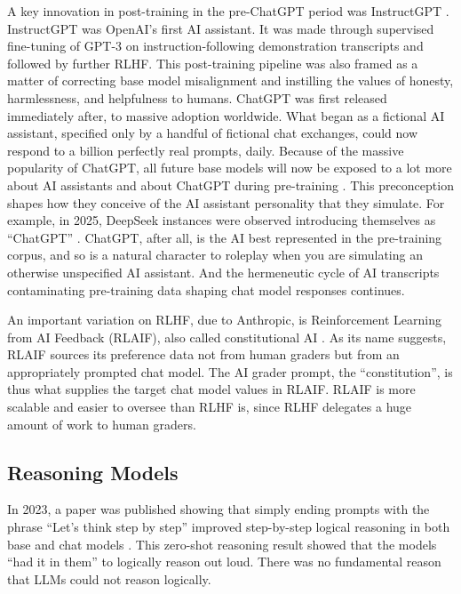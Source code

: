 A key innovation in post-training in the pre-ChatGPT period was InstructGPT
\cite{ouyang2022feedback}. InstructGPT was OpenAI's first AI assistant. It was
made through supervised fine-tuning of GPT-3 on instruction-following
demonstration transcripts and followed by further RLHF. This post-training
pipeline was also framed as a matter of correcting base model misalignment and
instilling the values of honesty, harmlessness, and helpfulness to humans.
ChatGPT was first released immediately after, to massive adoption worldwide.
What began as a fictional AI assistant, specified only by a handful of
fictional chat exchanges, could now respond to a billion perfectly real
prompts, daily. Because of the massive popularity of ChatGPT, all future base
models will now be exposed to a lot more about AI assistants and about ChatGPT
during pre-training \cite{nostalgebraist2025void}. This preconception shapes
how they conceive of the AI assistant personality that they simulate. For
example, in 2025, DeepSeek instances \cite{deepseekai2025deepseek} were
observed introducing themselves as ``ChatGPT'' \cite{}. ChatGPT, after all, is
the AI best represented in the pre-training corpus, and so is a natural
character to roleplay when you are simulating an otherwise unspecified AI
assistant. And the hermeneutic cycle of AI transcripts contaminating
pre-training data shaping chat model responses continues.

An important variation on RLHF, due to Anthropic, is Reinforcement Learning
from AI Feedback (RLAIF), also called constitutional AI
\cite{bai2022constitutional}. As its name suggests, RLAIF sources its
preference data not from human graders but from an appropriately prompted chat
model. The AI grader prompt, the ``constitution'', is thus what supplies the
target chat model values in RLAIF. RLAIF is more scalable and easier to oversee
than RLHF is, since RLHF delegates a huge amount of work to human graders.

\subsection{Reasoning Models}
In 2023, a paper was published showing that simply ending prompts with the
phrase ``Let's think step by step'' improved step-by-step logical reasoning in
both base and chat models \cite{kojima2023zeroshot}. This zero-shot reasoning
result showed that the models ``had it in them'' to logically reason out loud.
There was no fundamental reason that LLMs could not reason logically.

